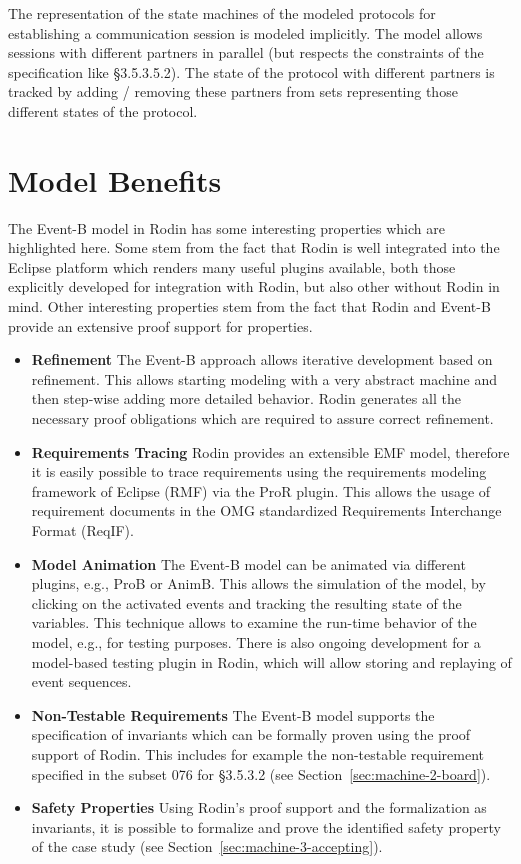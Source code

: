 \documentclass[10pt,a4paper]{article}
\begin{document}
The representation of the state machines of the modeled protocols for
establishing a communication session is modeled implicitly. The model allows
sessions with different partners in parallel (but respects the constraints of
the specification like §3.5.3.5.2). The state of the protocol with different
partners is tracked by adding / removing these partners from sets representing
those different states of the protocol.

\section{Model Benefits}
\label{sec:model-highlights}

The Event-B model in Rodin has some interesting properties which are highlighted
here. Some stem from the fact that Rodin is well integrated into the Eclipse
platform which renders many useful plugins available, both those explicitly
developed for integration with Rodin, but also other without Rodin in mind.
Other interesting properties stem from the fact that Rodin and Event-B provide
an extensive proof support for properties.

\begin{itemize}
\item {\bf Refinement} The Event-B approach allows iterative development based
  on refinement. This allows starting modeling with a very abstract machine and
  then step-wise adding more detailed behavior. Rodin generates all the
  necessary proof obligations which are required to assure correct refinement.
\item {\bf Requirements Tracing} Rodin provides an extensible EMF model,
  therefore it is easily possible to trace requirements using the requirements
  modeling framework of Eclipse (RMF) via the ProR plugin. This allows the usage
  of requirement documents in the OMG standardized Requirements Interchange
  Format (ReqIF).
\item {\bf Model Animation} The Event-B model can be animated via different
  plugins, e.g., ProB or AnimB. This allows the simulation of the model, by
  clicking on the activated events and tracking the resulting state of the
  variables. This technique allows to examine the run-time behavior of the
  model, e.g., for testing purposes. There is also ongoing development for a
  model-based testing plugin in Rodin, which will allow storing and replaying of
  event sequences.
\item {\bf Non-Testable Requirements} The Event-B model supports the
  specification of invariants which can be formally proven using the proof
  support of Rodin. This includes for example the non-testable requirement
  specified in the subset 076 for §3.5.3.2 (see
  Section~\ref{sec:machine-2-board}).
\item {\bf Safety Properties} Using Rodin's proof support and the formalization
  as invariants, it is possible to formalize and prove the identified safety
  property of the case study (see Section~\ref{sec:machine-3-accepting}).
\end{itemize}
\end{document}
